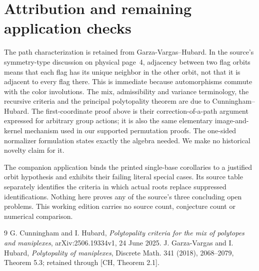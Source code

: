 \documentclass[a4paper,11pt]{article}
\begin{document}
\section{Attribution and remaining application checks}
The path characterization is retained from Garza-Vargas--Hubard.
In the source's symmetry-type discussion on physical page~4, adjacency
between two flag orbits means that each flag has its unique neighbor
in the other orbit, not that it is adjacent to every flag there. This
is immediate because automorphisms commute with the color involutions.
The mix, admissibility and variance terminology, the recursive criteria
and the principal polytopality theorem are due to Cunningham--Hubard.
The first-coordinate proof above is their correction-of-a-path argument
expressed for arbitrary group actions; it is also the same elementary
image-and-kernel mechanism used in our supported permutation proofs.
The one-sided normalizer formulation states exactly the algebra needed.
We make no historical novelty claim for it.

The companion application binds the printed single-base corollaries to
a justified orbit hypothesis and exhibits their failing literal special
cases. Its source table separately identifies the criteria in which
actual roots replace suppressed identifications. Nothing here proves any of the source's three
concluding open problems. This working edition carries no source count,
conjecture count or numerical comparison.

\begin{thebibliography}{9}
 G. Cunningham and I. Hubard, \emph{Polytopality criteria for the
mix of polytopes and maniplexes}, arXiv:2506.19334v1, 24 June 2025.
 J. Garza-Vargas and I. Hubard, \emph{Polytopality of maniplexes},
Discrete Math. 341 (2018), 2068--2079, Theorem 5.3; retained through
[CH, Theorem 2.1].
\end{thebibliography}
\end{document}
